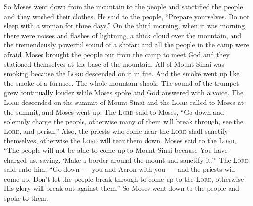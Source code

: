 \begin{inparaenum}
   So Moses went down from the mountain to the people and sanctified the people and they washed their clothes.%
   He said to the people, ``Prepare yourselves. Do not sleep with a woman for three days.''%
   On the third morning, when it was morning, there were noises and flashes of lightning, a thick cloud over the mountain, and the tremendously powerful sound of a shofar: and all the people in the camp were afraid.%
   Moses brought the people out from the camp to meet God and they stationed themselves at the base of the mountain.%
   All of Mount Sinai was smoking because the \textsc{Lord} descended on it in fire. And the smoke went up like the smoke of a furnace. The whole mountain shook.%
   The sound of the trumpet grew continually louder while Moses spoke and God answered with a voice.%
   The \textsc{Lord} descended on the summit of Mount Sinai and the \textsc{Lord} called to Moses at the summit, and Moses went up.%
   The \textsc{Lord} said to Moses, ``Go down and solemnly charge the people, otherwise many of them will break through, see the \textsc{Lord}, and perish.''%
   Also, the priests who come near the \textsc{Lord} shall sanctify themselves, otherwise the \textsc{Lord} will tear them down.%
   Moses said to the \textsc{Lord}, ``The people will not be able to come up to Mount Sinai because You have charged us, saying, `Make a border around the mount and sanctify it.'\thinspace''%
   The \textsc{Lord} said unto him, ``Go down~--- you and Aaron with you~--- and the priests will come up. Don't let the people break through to come up to the \textsc{Lord}, otherwise His glory will break out against them.''%
   So Moses went down to the people and spoke to them.%
\end{inparaenum}

